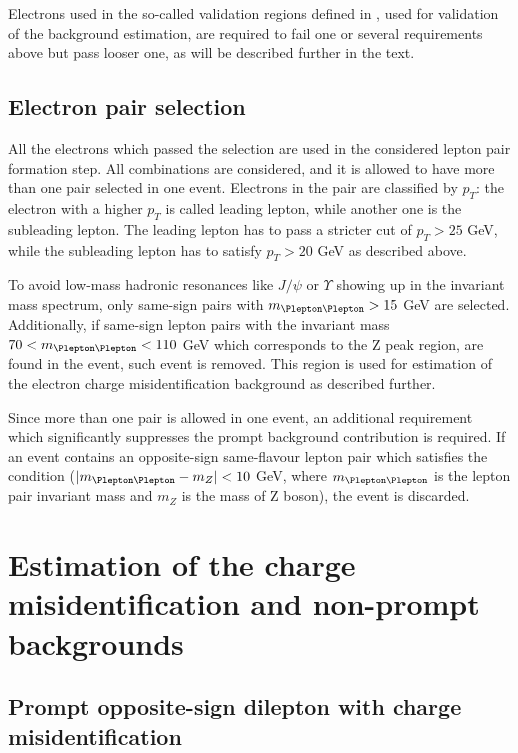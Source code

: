 Electrons used in the so-called validation regions defined in , used for validation of the background estimation, 
are required to fail one or several requirements above but pass looser one, as will be described further in the text.

\subsection{Electron pair selection}
All the electrons which passed the selection are used in the considered lepton pair formation step.
All combinations are considered, and it is allowed to have more than one pair selected in one event.
Electrons in the pair are classified by $p_T$: the electron with a higher $p_T$ is called leading lepton, while another one is the subleading lepton.
The leading lepton has to pass a stricter cut of $p_T>25$ GeV, while the subleading lepton has to satisfy $p_T>20$ GeV as described above.

To avoid low-mass hadronic resonances like $J/\psi$ or $\varUpsilon$ showing up in the invariant mass spectrum, 
only same-sign pairs with $m_{\Plepton\Plepton}>15$ GeV are selected.
Additionally, if same-sign lepton pairs with the invariant mass $70 < m_{\Plepton\Plepton}< 110$ GeV 
which corresponds to the Z peak region, are found in the event, such event is removed.
This region is used for estimation of the electron charge misidentification background as described further.

Since more than one pair is allowed in one event, an additional requirement which significantly suppresses the prompt background contribution is required.
If an event contains an opposite-sign same-flavour lepton pair which satisfies the condition ($|m_{\Plepton\Plepton} - m_{Z}| < 10$ GeV,
where $m_{\Plepton\Plepton}$ is the lepton pair invariant mass and $m_{Z}$ is the mass of Z boson), the event is discarded.

\section{Estimation of the charge misidentification and non-prompt backgrounds}

\subsection{Prompt opposite-sign dilepton with charge misidentification}
\label{subsec:CF_definition}

